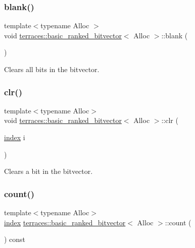 \subsubsection{\texorpdfstring{blank()}{blank()}}
{\footnotesize\ttfamily template$<$typename Alloc $>$ \\
void \hyperlink{classterraces_1_1basic__ranked__bitvector}{terraces\+::basic\+\_\+ranked\+\_\+bitvector}$<$ Alloc $>$\+::blank (\begin{DoxyParamCaption}{ }\end{DoxyParamCaption})}

Clears all bits in the bitvector. \mbox{\label{classterraces_1_1basic__ranked__bitvector_ab473239260d7a43c5c000f258e69b35f}} 
\subsubsection{\texorpdfstring{clr()}{clr()}}
{\footnotesize\ttfamily template$<$typename Alloc$>$ \\
void \hyperlink{classterraces_1_1basic__ranked__bitvector}{terraces\+::basic\+\_\+ranked\+\_\+bitvector}$<$ Alloc $>$\+::clr (\begin{DoxyParamCaption}\item[{\hyperlink{namespaceterraces_adbc33ccb543d1634e96d0eb02e472c77}{index}}]{i }\end{DoxyParamCaption})\hspace{0.3cm}{\ttfamily [inline]}}

Clears a bit in the bitvector. \mbox{\label{classterraces_1_1basic__ranked__bitvector_a1d7f3da0a64ed420e4836994cd8cba3c}} 
\subsubsection{\texorpdfstring{count()}{count()}}
{\footnotesize\ttfamily template$<$typename Alloc$>$ \\
\hyperlink{namespaceterraces_adbc33ccb543d1634e96d0eb02e472c77}{index} \hyperlink{classterraces_1_1basic__ranked__bitvector}{terraces\+::basic\+\_\+ranked\+\_\+bitvector}$<$ Alloc $>$\+::count (\begin{DoxyParamCaption}{ }\end{DoxyParamCaption}) const\hspace{0.3cm}{\ttfamily [inline]}}

